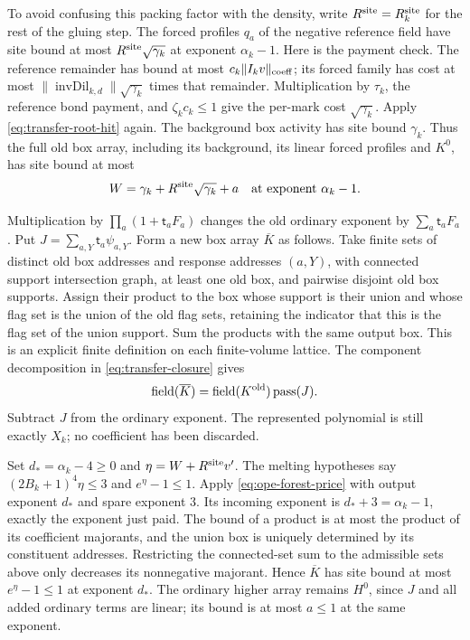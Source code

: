 To avoid confusing this packing factor with the density, write
$R^{\rm site}=R_k^{\rm site}$ for the rest of the gluing step.
The forced profiles $q_a$ of the negative reference field have
site bound at most $R^{\rm site}\sqrt{\gamma_k}$ at exponent
$\alpha_k-1$. Here is the payment check. The reference remainder
has bound at most $c_k\|I_kv\|_{\rm coeff}$; its forced family
has cost at most $\|\operatorname{invDil}_{k,d}\|\sqrt{\gamma_k}$
times that remainder. Multiplication by $\tau_k$, the reference
bond payment, and $\zeta_kc_k\le1$ give the per-mark cost
$\sqrt{\gamma_k}$. Apply \eqref{eq:transfer-root-hit} again.
The background box activity has site bound $\gamma_k$. Thus the
full old box array, including its background, its linear forced
profiles and $K^0$, has site bound at most
\[
 W=\gamma_k+R^{\rm site}\sqrt{\gamma_k}+a
                       \quad\hbox{at exponent }\alpha_k-1.
\]

Multiplication by $\prod_a(1+\mathsf t_aF_a)$ changes the old
ordinary exponent by $\sum_a\mathsf t_aF_a$. Put
$J=\sum_{a,Y}\mathsf t_a\psi_{a,Y}$. Form a new box array
$\overline K$ as follows. Take finite sets of distinct old box
addresses and response addresses $(a,Y)$, with connected support
intersection graph, at least one old box, and pairwise disjoint
old box supports. Assign their product to the box whose support
is their union and whose flag set is the union of the old flag
sets, retaining the indicator that this is the flag set of the
union support. Sum the products with the same output box. This is
an explicit finite definition on each finite-volume lattice.
The component decomposition in \eqref{eq:transfer-closure} gives
\[
 \operatorname{field}(\overline K)
   =\operatorname{field}(K^{\rm old})\operatorname{pass}(J).
\]
Subtract $J$ from the ordinary exponent. The represented polynomial
is still exactly $X_k$; no coefficient has been discarded.

Set $d_*=\alpha_k-4\ge0$ and
$\eta=W+R^{\rm site}v'$. The melting hypotheses say
$(2B_k+1)^4\eta\le3$ and $e^\eta-1\le1$.
Apply \eqref{eq:ope-forest-price} with output exponent $d_*$
and spare exponent $3$. Its incoming exponent is
$d_*+3=\alpha_k-1$, exactly the exponent just paid. The bound
of a product is at most the product of its coefficient majorants,
and the union box is uniquely determined by its constituent
addresses. Restricting the connected-set sum to the admissible
sets above only decreases its nonnegative majorant. Hence
$\overline K$ has site bound at most $e^\eta-1\le1$ at exponent
$d_*$. The ordinary higher array remains $H^0$, since $J$ and
all added ordinary terms are linear; its bound is at most
$a\le1$ at the same exponent.

